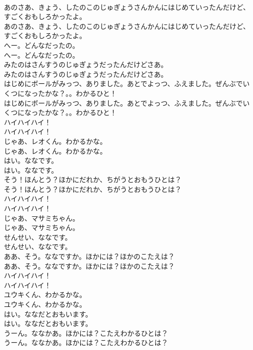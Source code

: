 \documentclass[8pt]{extreport}
\begin{document}
\begin{CJK}{UTF8}{min}
\\	あのさあ、きょう、したのこのじゅぎょうさんかんにはじめていったんだけど、すごくおもしろかったよ。
\\	あのさあ、きょう、したのこのじゅぎょうさんかんにはじめていったんだけど、すごくおもしろかったよ。
\\	へー。どんなだったの。
\\	へー。どんなだったの。
\\	みたのはさんすうのじゅぎょうだったんだけどさあ。
\\	みたのはさんすうのじゅぎょうだったんだけどさあ。
\\	はじめにボールがみっつ、ありました。あとでよっつ、ふえました。ぜんぶでいくつになったかな？。。わかるひと！
\\	はじめにボールがみっつ、ありました。あとでよっつ、ふえました。ぜんぶでいくつになったかな？。。わかるひと！
\\	ハイハイハイ！
\\	ハイハイハイ！
\\	じゃあ、レオくん。わかるかな。
\\	じゃあ、レオくん。わかるかな。
\\	はい。ななです。
\\	はい。ななです。
\\	そう！ほんとう？ほかにだれか、ちがうとおもうひとは？
\\	そう！ほんとう？ほかにだれか、ちがうとおもうひとは？
\\	ハイハイハイ！
\\	ハイハイハイ！
\\	じゃあ、マサミちゃん。
\\	じゃあ、マサミちゃん。
\\	せんせい、ななです。
\\	せんせい、ななです。
\\	ああ、そう。ななですか。ほかには？ほかのこたえは？
\\	ああ、そう。ななですか。ほかには？ほかのこたえは？
\\	ハイハイハイ！
\\	ハイハイハイ！
\\	ユウキくん、わかるかな。
\\	ユウキくん、わかるかな。
\\	はい。ななだとおもいます。
\\	はい。ななだとおもいます。
\\	うーん。ななかあ。ほかには？こたえわかるひとは？
\\	うーん。ななかあ。ほかには？こたえわかるひとは？

\end{CJK}
\end{document}
